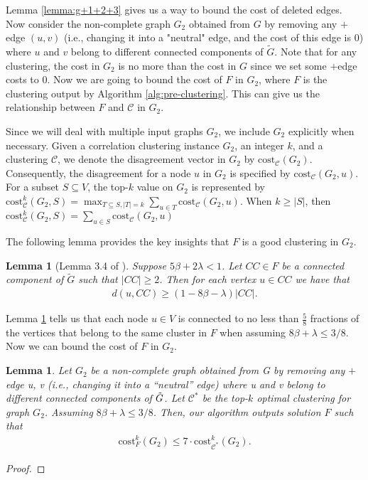 \documentclass[11pt]{article}
\newcommand{\cost}{\mathrm{cost}}
\newtheorem{lemma}[theorem]{Lemma}
\newcommand{\calC}{{\mathcal{C}}}
\begin{document}
\begin{CJK*}{UTF8}{gbsn}
Lemma \ref{lemma:g+1+2+3} gives us a way to bound the cost of deleted edges. Now consider the non-complete graph $G_2$ obtained from $G$ by removing any $+$edge $(u, v)$ (i.e., changing it into a "neutral" edge, and the cost of this edge is $0$) where $u$ and $v$ belong to different connected components of $\tilde{G}$. Note that for any clustering, the cost in $G_2$ is no more than the cost in $G$ since we set some $+$edge costs to 0. Now we are going to bound the cost of $F$ in $G_2$, where $F$ is the clustering output by Algorithm \ref{alg:pre-clustering}. This can give us the relationship between $F$ and $\calC$ in $G_2$. 

Since we will deal with multiple input graphs $G_2$, we include $G_2$ explicitly when necessary. Given a correlation clustering instance $G_2$, an integer $k$, and a clustering $\mathcal{C}$, we denote the disagreement vector in $G_2$ by $\cost_\calC(G_2)$. Consequently, the disagreement for a node $u$ in $G_2$ is specified by $\cost_\calC(G_2, u)$. For a subset $S \subseteq V$, the top-$k$ value on $G_2$ is represented by $\cost^k_\calC(G_2, S) = \max_{T \subseteq S, |T| = k} \sum_{u \in T} \cost_\calC(G_2, u)$. When $k \geq |S|$, then $\cost^k_\calC(G_2, S) = \sum_{u \in S} \cost_\calC(G_2, u)$

The following lemma provides the key insights that $F$ is a good clustering in $G_2$.

\begin{lemma}[Lemma 3.4 of \cite{cohen2021correlation}]
\label{lemma:preclusteringconnecttomostnodesinsameclustering}
    Suppose $5\beta + 2\lambda < 1$. Let $CC \in F$ be a connected component of $\widetilde{G}$ such that $|CC|\ge 2$. Then for each vertex $u\in CC$ we have that 
    \begin{align*}
        d(u,CC)\ge (1-8\beta-\lambda)|CC|.
    \end{align*}
\end{lemma}

Lemma \ref{lemma:preclusteringconnecttomostnodesinsameclustering} tells us that each node $u \in V$ is connected to no less than $\frac{5}{8}$ fractions of the vertices that belong to the same cluster in $F$ when assuming $8\beta + \lambda \leq 3/8$. Now we can bound the cost of $F$ in $G_2$.

\begin{lemma}
\label{lem:nearoptimalindeletedgraph}
Let $G_2$ be a non-complete graph obtained from G by removing any $+$ edge {u, v} (i.e., changing it into a
“neutral” edge) where u and v belong to different connected components of $\Tilde{G}$. Let $\mathcal{C}^*$ be the top-$k$ optimal clustering for graph $G_2$. Assuming $8\beta + \lambda \leq 3/8$. Then, our algorithm outputs solution $F$ such that 
\begin{align*}
    \cost^k_{F}(G_2) \leq 7\cdot \cost^k_{\calC^*}(G_2).
\end{align*}
\end{lemma}
\begin{proof}


\end{proof}
\end{CJK*}
\end{document}

